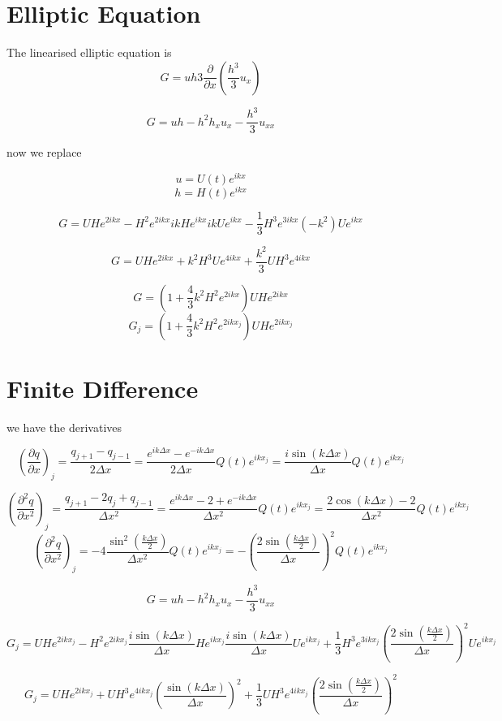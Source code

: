 \documentclass[12pt]{article}
\begin{document}
\section{Elliptic Equation}
The linearised elliptic equation is
\[G = uh 3\frac{\partial}{\partial x}\left(\frac{h^3}{3}u_x\right)\]

\[G = uh - h^2h_xu_x - \frac{h^3}{3}u_{xx}\]

now we replace

\[u = U(t)e^{ikx}\]
\[h = H(t)e^{ikx}\]

\[G = UH e^{2ikx} - H^2 e^{2ikx} ikH e^{ikx} ikU e^{ikx}  - \frac{1}{3} H^3 e^{3ikx} (-k^2 )U e^{ikx}\]

\[G = UH e^{2ikx} +k^2 H^3U e^{4ikx}  +  \frac{k^2}{3} UH^3 e^{4ikx}\]

\[G = \left(1 + \frac{4}{3}k^2 H^2 e^{2ikx} \right)UH e^{2ikx}\]
\[G_j = \left(1 + \frac{4}{3}k^2 H^2 e^{2ikx_j} \right)UH e^{2ikx_j}\]

\section{Finite Difference}

we have the derivatives

\[\left(\frac{\partial q}{\partial x}\right)_j= \frac{q_{j+1} - q_{j-1}}{2\Delta x} = \frac{e^{ik\Delta x} - e^{-ik\Delta x}}{2\Delta x} Q(t)e^{ikx_j} =\frac{i\sin\left(k\Delta x\right)}{\Delta x} Q(t)e^{ikx_j} \]

\[\left(\frac{\partial^2 q}{\partial x^2}\right)_j= \frac{q_{j+1} -2q_j + q_{j-1}}{\Delta x^2} = \frac{e^{ik\Delta x} - 2 + e^{-ik\Delta x}}{\Delta x^2} Q(t)e^{ikx_j} =\frac{2\cos\left(k\Delta x\right) - 2}{\Delta x^2} Q(t)e^{ikx_j} \]
\[\left(\frac{\partial^2 q}{\partial x^2}\right)_j=  -4\frac{\sin^2\left(\frac{k\Delta x}{2}\right)}{\Delta x^2} Q(t)e^{ikx_j} =  - \left(\frac{2\sin\left(\frac{k\Delta x}{2}\right)}{\Delta x}\right)^2 Q(t)e^{ikx_j}\]

\[G = uh - h^2h_xu_x - \frac{h^3}{3}u_{xx}\]

\[G_j = UH e^{2ikx_j} - H^2 e^{2ikx_j} \frac{i\sin\left(k\Delta x\right)}{\Delta x} He^{ikx_j} \frac{i\sin\left(k\Delta x\right)}{\Delta x} Ue^{ikx_j}  + \frac{1}{3} H^3 e^{3ikx_j} \left(\frac{2\sin\left(\frac{k\Delta x}{2}\right)}{\Delta x}\right)^2 Ue^{ikx_j}\]

\[G_j = UH e^{2ikx_j} + UH^3 e^{4ikx_j} \left(\frac{\sin\left(k\Delta x\right)}{\Delta x}\right)^2  + \frac{1}{3} UH^3 e^{4ikx_j} \left(\frac{2\sin\left(\frac{k\Delta x}{2}\right)}{\Delta x}\right)^2\]
\end{document}
